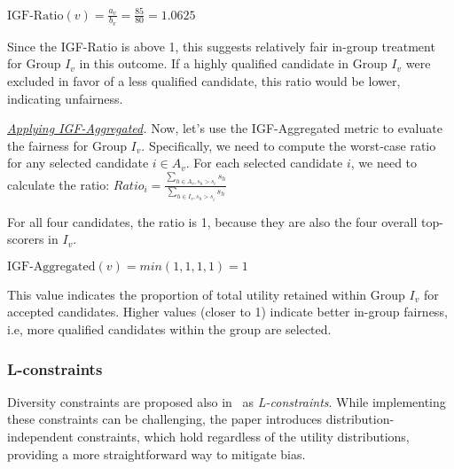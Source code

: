 \begin{example}
\(\text{IGF-Ratio}(v)=\frac{a_v}{b_v}=\frac{85}{80}=1.0625 \)

Since the IGF-Ratio is above 1, this suggests relatively fair in-group treatment for Group $I_v$ in this outcome. If a highly qualified candidate in Group $I_v$ were excluded in favor of a less qualified candidate, this ratio would be lower, indicating unfairness. 

\noindent\emph{\underline{Applying IGF-Aggregated}.} 
%
Now, let’s use the IGF-Aggregated metric to evaluate the fairness for Group $I_v$. Specifically, we need to compute the worst-case ratio for any selected candidate $i \in A_v$. For each selected candidate $i$, we need to calculate the ratio:
\(Ratio_i = \frac{\sum_{h \in A_{v}, s_h> s_i} s_h}{\sum_{h \in I_{v}, s_h> s_i} s_h}\)

For all four candidates, the ratio is 1, because they are also the four overall top-scorers in $I_v$.

\(\text{IGF-Aggregated}(v)=min (1,1,1,1)= 1 \)

This value indicates the proportion of total utility retained within Group $I_v$ for accepted candidates. Higher values (closer to 1) indicate better in-group fairness, i.e, more qualified candidates within the group are selected.
\qedfull
\end{example}


\subsubsection{L-constraints}
\label{subsec:intrank_meth_constr_10n}
%

Diversity constraints are proposed also in~\cite{celis2020interventions}
as \emph{L-constraints}. While implementing these constraints can be challenging, the paper introduces distribution-independent constraints, which hold regardless of the utility distributions, providing a more straightforward way to mitigate bias.

